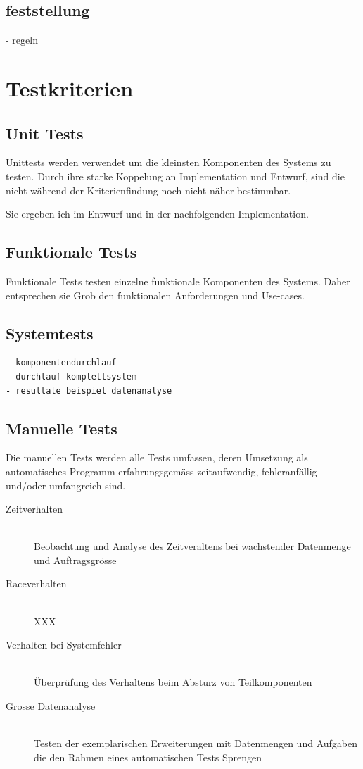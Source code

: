 \subsection{feststellung}
 - regeln


\section{Testkriterien}
\subsection{Unit Tests}

Unittests werden verwendet um die kleinsten Komponenten des Systems zu testen.
Durch ihre starke Koppelung an Implementation und Entwurf,
sind die nicht w\"ahrend der Kriterienfindung noch nicht n\"aher bestimmbar.

Sie ergeben ich im Entwurf und in der nachfolgenden Implementation.

\subsection{Funktionale Tests}

Funktionale Tests testen einzelne funktionale Komponenten des Systems.
Daher entsprechen sie Grob den funktionalen Anforderungen und Use-cases.

\subsection{Systemtests}

\begin{verbatim}
- komponentendurchlauf
- durchlauf komplettsystem
- resultate beispiel datenanalyse

\end{verbatim}

\subsection{Manuelle Tests}

Die manuellen Tests werden alle Tests umfassen,
deren Umsetzung als automatisches Programm erfahrungsgem\"ass zeitaufwendig,
fehleranf\"allig und/oder umfangreich sind.


\begin{description}
  \item[Zeitverhalten] \hfill \\
    Beobachtung und Analyse des Zeitveraltens bei wachstender Datenmenge und Auftragsgr\"osse
  \item[Raceverhalten] \hfill \\
    XXX
  \item[Verhalten bei Systemfehler]\hfill \\
    \"Uberpr\"ufung des Verhaltens beim Absturz von Teilkomponenten
  \item[Grosse Datenanalyse] \hfill \\
    Testen der exemplarischen Erweiterungen mit Datenmengen und Aufgaben
    die den Rahmen eines automatischen Tests Sprengen
\end{description}

